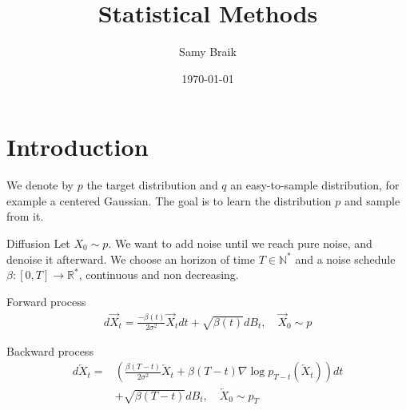 \documentclass{beamer}
\title{Statistical Methods}
\author{Samy Braik}
\date{\today}
\begin{document}
\begin{frame}
    \titlepage
\end{frame}

\section{Introduction}

\begin{frame}
    We denote by \(p\) the target distribution and \(q\) an easy-to-sample distribution, for example a centered Gaussian. The goal is to learn the distribution \(p\) and sample from it.\\
\end{frame}

\begin{frame}{Diffusion}
    Let \(X_0\sim p\). We want to add noise until we reach pure noise, and denoise it afterward. We choose an horizon of time \(T\in\mathbb{N}^*\) and a noise schedule \(\beta:[0,T]\rightarrow\mathbb{R}^*\), continuous and non decreasing.

    \begin{block}{Forward process}
        \begin{align}
            d\overrightarrow{X}_t = \frac{-\beta(t)}{2\sigma^2}\overrightarrow{X}_t dt + \sqrt{\beta(t)}dB_t, \quad \overrightarrow{X}_0\sim p
        \end{align}
    \end{block}

    \begin{block}{Backward process}
        \begin{align}
            d\overleftarrow{X}_t=&\left(  \frac{\beta(T-t)}{2\sigma^2}\overleftarrow{X}_t+\beta(T-t)\nabla\log p_{T-t}\left(\overleftarrow{X}_t \right)  \right)dt \\ &+ \sqrt{\beta(T-t)}dB_t, \quad \overleftarrow{X}_0\sim p_T \nonumber
        \end{align}
            
    \end{block}
\end{frame}
\end{document}
